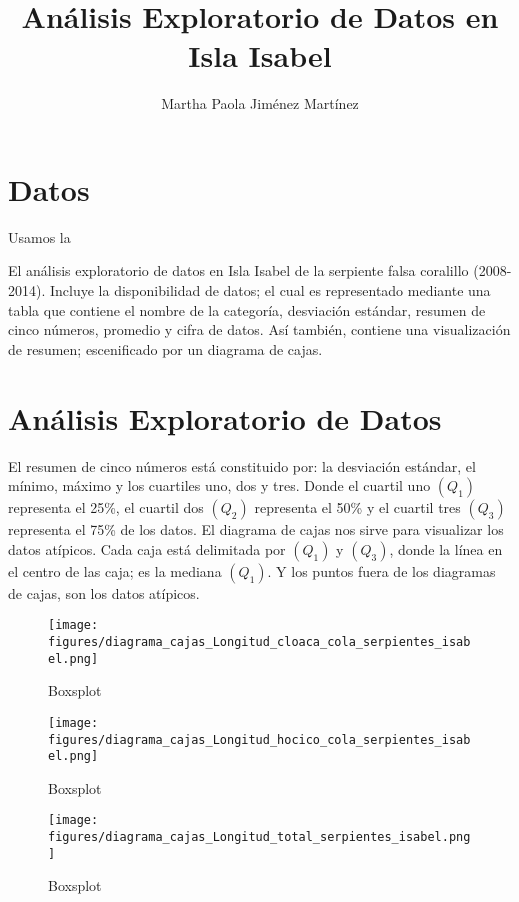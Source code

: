 \documentclass{article}
\author{Martha Paola Jiménez Martínez}
\title{Análisis Exploratorio de Datos en Isla Isabel}
\begin{document}
 
\maketitle


\section{Datos}
Usamos la 

El análisis exploratorio de datos en Isla Isabel de la serpiente falsa coralillo (2008-2014).
Incluye la disponibilidad de datos; el cual es representado mediante una tabla que contiene el
nombre de la categoría, desviación estándar, resumen de cinco números, promedio y cifra de datos.
Así también, contiene una visualización de resumen; escenificado por un diagrama de cajas.

\section{Análisis Exploratorio de Datos}
El resumen de cinco números está constituido por: la desviación estándar, el mínimo, máximo y los cuartiles uno, dos y tres. Donde el cuartil uno $(Q_1)$ representa el 25\%, el cuartil dos $(Q_2)$ representa el 50\% y el cuartil tres $(Q_3)$ representa el 75\% de los datos. 
El diagrama de cajas nos sirve para visualizar los datos atípicos. Cada caja está delimitada por $(Q_1)$ y $(Q_3)$, donde la línea en el centro de las caja; es la mediana $(Q_1)$. Y los puntos fuera de los diagramas de cajas, son los datos atípicos.

\begin{figure}
\centering
\caption{Boxsplot}
\label{fig:pngBoxsplotLongitudTotal}
\texttt{[image: figures/diagrama\_cajas\_Longitud\_cloaca\_cola\_serpientes\_isabel.png]}
\end{figure}

\begin{figure}
\centering
\caption{Boxsplot}
\label{fig:pngBoxsplotLongitudTotal}
\texttt{[image: figures/diagrama\_cajas\_Longitud\_hocico\_cola\_serpientes\_isabel.png]}
\end{figure}

\begin{figure}
\centering
\caption{Boxsplot}
\label{fig:pngBoxsplotLongitudTotal}
\texttt{[image: figures/diagrama\_cajas\_Longitud\_total\_serpientes\_isabel.png]}
\end{figure}
\end{document}
